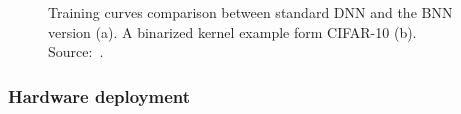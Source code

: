 


\begin{figure}
    \centering
    \caption{Training curves comparison between standard DNN and the BNN version (a). A binarized kernel example form CIFAR-10 (b). Source:~\cite{courbariaux2016binarized}. }
    \label{fig:bnn_training}
\end{figure}

\subsubsection*{Hardware deployment}

